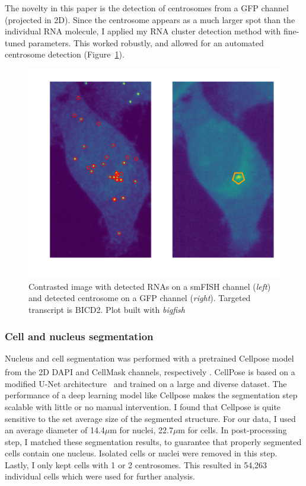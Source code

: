 The novelty in this paper is the detection of centrosomes from a \ac{GFP} channel (projected in 2D).
Since the centrosome appears as a much larger spot than the individual \ac{RNA} molecule, I applied my \ac{RNA} cluster detection method with fine-tuned parameters.
This worked robustly, and allowed for an automated centrosome detection (Figure~\ref{fig:centrosomes}).

\begin{figure}[]
    \centering
    \includegraphics[width=\textwidth]{figures/chapter5/centrosomes}
    \caption[RNA and centrosome detection results]{Contrasted image with detected RNAs on a smFISH channel (\textit{left}) and detected centrosome on a GFP channel (\textit{right}).
	Targeted transcript is BICD2.
	Plot built with \emph{bigfish}}
    \label{fig:centrosomes}
\end{figure}

\subsubsection{Cell and nucleus segmentation}

Nucleus and cell segmentation was performed with a pretrained Cellpose model~\cite{stringer_cellpose_2021} from the 2D DAPI and CellMask\textsuperscript{\texttrademark} channels, respectively .
CellPose is based on a modified U-Net architecture~\cite{Ronneberger_2015} and trained on a large and diverse dataset.
The performance of a deep learning model like Cellpose makes the segmentation step scalable with little or no manual intervention.
I found that Cellpose is quite sensitive to the set average size of the segmented structure.
For our data, I used an average diameter of 14.4$\mu$m  for nuclei, 22.7$\mu$m for cells.
In  post-processing step, I matched these segmentation results, to guarantee that properly segmented cells contain one nucleus.
Isolated cells or nuclei were removed in this step.
Lastly, I only kept cells with 1 or 2 centrosomes.
This resulted in 54,263 individual cells which were used for further analysis.

